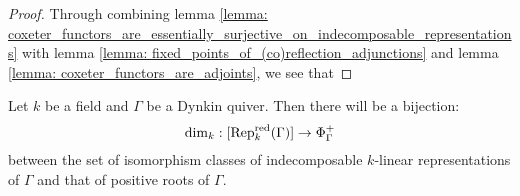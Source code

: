                 \begin{proof}
                    Through combining lemma \ref{lemma: coxeter_functors_are_essentially_surjective_on_indecomposable_representations} with lemma \ref{lemma: fixed_points_of_(co)reflection_adjunctions} and lemma \ref{lemma: coxeter_functors_are_adjoints}, we see that 
                \end{proof}
            \begin{theorem} \label{theorem: gabriel_theorem_dynkin_implies_representation_finite}
                Let $k$ be a field and $\Gamma$ be a Dynkin quiver. Then there will be a bijection:
                    $$\dim_k: [\mathrm{Rep}_k^{\mathrm{red}}(\Gamma)] \to \Phi_{\Gamma}^+$$
                between the set of isomorphism classes of indecomposable $k$-linear representations of $\Gamma$ and that of positive roots of $\Gamma$.
            \end{theorem}
